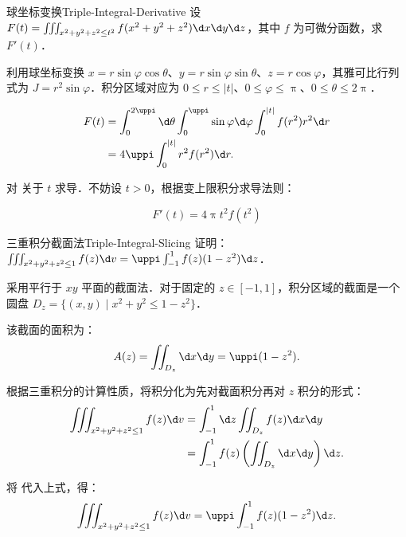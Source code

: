 \begin{problem}{球坐标变换}{Triple-Integral-Derivative}
    设 $F(t) = \iiint_{x^2+y^2+z^2 \le t^2} f(x^2+y^2+z^2) \d x \d y \d z$，其中 $f$ 为可微分函数，求 $F'(t)$．
\end{problem}

\begin{solution}
    利用球坐标变换 $x = r \sin \varphi \cos \theta$、$y = r \sin \varphi \sin \theta$、$z = r \cos \varphi$，其雅可比行列式为 $J = r^2 \sin \varphi$．积分区域对应为 $0 \le r \le |t|$、$0 \le \varphi \le \uppi$、$0 \le \theta \le 2\uppi$．

    \begin{equation}
        \begin{aligned}
            F(t) & = \int_0^{2\uppi} \d \theta \int_0^{\uppi} \sin \varphi \d \varphi \int_0^{|t|} f(r^2) r^2 \d r \\
                 & = 4\uppi \int_0^{|t|} r^2 f(r^2) \d r.
        \end{aligned}
        \label{eq:F-integral-form}
    \end{equation}

    对  关于 $t$ 求导．不妨设 $t > 0$，根据变上限积分求导法则：

    \begin{equation}
        \boxed{F'(t) = 4\uppi t^2 f(t^2)}
    \end{equation}
\end{solution}

\begin{problem}{三重积分截面法}{Triple-Integral-Slicing}
    证明：$\iiint_{x^2+y^2+z^2 \le 1} f(z) \d v = \uppi \int_{-1}^1 f(z)(1 - z^2) \d z$．
\end{problem}

\begin{myproof}
    采用平行于 $xy$ 平面的截面法．对于固定的 $z \in [-1, 1]$，积分区域的截面是一个圆盘 $D_z = \{ (x, y) \mid x^2 + y^2 \le 1 - z^2 \}$．

    该截面的面积为：
    \begin{equation}
        A(z) = \iint_{D_z} \d x \d y = \uppi (1 - z^2).
        \label{eq:area-element}
    \end{equation}

    根据三重积分的计算性质，将积分化为先对截面积分再对 $z$ 积分的形式：
    \begin{equation}
        \begin{aligned}
            \iiint_{x^2+y^2+z^2 \le 1} f(z) \d v & = \int_{-1}^1 \d z \iint_{D_z} f(z) \d x \d y                 \\
                                                 & = \int_{-1}^1 f(z) \left( \iint_{D_z} \d x \d y \right) \d z.
        \end{aligned}
    \end{equation}

    将  代入上式，得：
    \begin{equation}
        \iiint_{x^2+y^2+z^2 \le 1} f(z) \d v = \uppi \int_{-1}^1 f(z)(1 - z^2) \d z.
    \end{equation}
\end{myproof}

